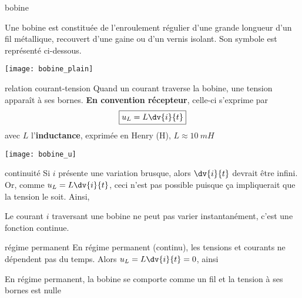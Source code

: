 \documentclass[../main/main.tex]{subfiles}
\begin{document}
\begin{tcbraster}[raster columns=3, raster equal height=rows]
    \begin{defi}[label=def:bobine]{bobine}

        Une bobine est constituée de l'enroulement régulier d'une grande
        longueur d'un fil métallique, recouvert d'une gaine ou d'un vernis
        isolant. Son symbole est représenté ci-dessous.
        \tcblower
        \begin{center}
            \texttt{[image: bobine\_plain]}
        \end{center}
    \end{defi}
    \begin{prop}[label=prop:Lcarac, raster multicolumn=2]{relation courant-tension}
        Quand un courant traverse la bobine, une tension apparaît à ses bornes.
        \textbf{En convention récepteur}, celle-ci s'exprime par
        \[\boxed{u_L = L\dv{i}{t}}\]
        avec $L$ l'\textbf{inductance}, exprimée en Henry (H), $L \approx
        \SI{10}{mH}$
        \tcblower
        \begin{center}
            \texttt{[image: bobine\_u]}
        \end{center}
    \end{prop}
\end{tcbraster}
\begin{tcbraster}[raster columns=2, raster equal height=rows]
    \begin{impl}[label=impl:continuité]{continuité}
        Si $i$ présente une variation brusque, alors $ \dv{i}{t}$ devrait
        être infini. Or, comme $u_L = L\dv{i}{t}$, ceci n'est pas possible
        puisque ça impliquerait que la tension le soit. Ainsi,\vspace*{-10pt}
        \begin{framed}
            Le courant $i$ traversant une bobine ne peut pas
            varier instantanément, c'est une fonction continue.
        \end{framed}
    \end{impl}
    \begin{impl}[label=impl:permanent]{régime permanent}
        En régime permanent (continu), les tensions et courants ne dépendent pas
        du temps. Alors $u_L = L \dv{i}{t} = 0$, ainsi
        \begin{framed}
            En régime permanent, la bobine se comporte comme un
            fil et la tension à ses bornes est nulle
        \end{framed}
    \end{impl}
\end{tcbraster}
\end{document}
